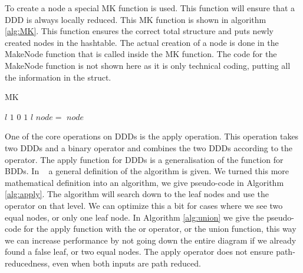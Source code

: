 To create a node a special MK function is used. This function will ensure that a DDD is always locally reduced. This MK function is shown in algorithm \ref{alg:MK}. This function ensures the correct total structure and puts newly created nodes in the hashtable. The actual creation of a node is done in the MakeNode function that is called inside the MK function. The code for the MakeNode function is not shown here as it is only technical coding, putting all the information in the struct.
\begin{algorithm}
\caption{MK}\label{alg:MK}
\begin{algorithmic}[1]
		\State \Return $l$
	\EndIf
		\State \Return $1$
	\EndIf
		\State \Return $0$
	\EndIf
		\State \Return $1$
	\EndIf
		\State \Return $l$
	\EndIf
	\State $node =$ 
		\State {}
	\EndIf
	\State \Return $node$
\EndProcedure	
\end{algorithmic}
\end{algorithm}


One of the core operations on DDDs is the apply operation. This operation takes two DDDs and a binary operator and combines the two DDDs according to the operator. The apply function for DDDs is a generalisation of the function for BDDs. In ~\cite{ddds} a general definition of the algorithm is given. We turned this more mathematical definition into an algorithm, we give pseudo-code in Algorithm \ref{alg:apply}. The algorithm will search down to the leaf nodes and use the operator on that level. We can optimize this a bit for cases where we see two equal nodes, or only one leaf node. In Algorithm \ref{alg:union} we give the pseudo-code for the apply function with the or operator, or the union function, this way we can increase performance by not going down the entire diagram if we already found a false leaf, or two equal nodes. The apply operator does not ensure path-reducedness, even when both inputs are path reduced. 

